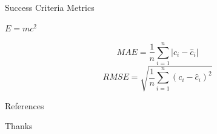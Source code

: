 \documentclass[aspectratio=169,xcolor=dvipsnames]{beamer}
\begin{document}

\begin{frame}{Success Criteria Metrics}
	\begin{theorem}
		$E = mc^2$
	\end{theorem}
	\begin{equation}
		MAE=\frac{1}{n}\sum_{i=1}^{n}|c_i- \hat{c}_i|
	\end{equation} 
	\begin{equation}
		RMSE=\sqrt{\frac{1}{n}\sum_{i=1}^{n}(c_i - \hat{c}_i)^2}
	\end{equation}
\end{frame}


\begin{frame}[allowframebreaks]{References}
    \printbibliography
\end{frame}


\begin{frame}
    \Huge{\centerline{Thanks}}
\end{frame}


	
\end{document}
